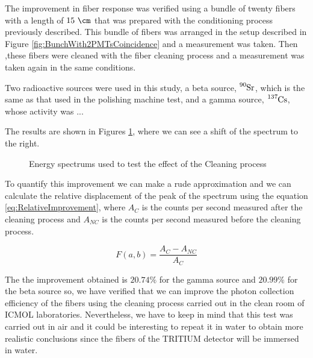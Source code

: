 The improvement in fiber response was verified using a bundle of twenty fibers with a length of $15~\cm$ that was prepared with the conditioning process previously described. This bundle of fibers was arranged in the setup described in Figure \ref{fig:BunchWith2PMTsCoincidence} and a measurement was taken. Then ,these fibers were cleaned with the fiber cleaning process and a measurement was taken again in the same conditions.

Two radioactive sources were used in this study, a beta source, $\ce{^{90}Sr}$, which is the same as that used in the polishing machine test, and a gamma source, $\ce{^{137}Cs}$, whose activity was ...

The results are shown in Figures \ref{fig:ResultsOfCleaningProcess}, where we can see a shift of the spectrum to the right. 

\begin{figure}[htbp]
 \centering
    \newline
 \caption{Energy spectrums used to test the effect of the Cleaning process}
 \label{fig:ResultsOfCleaningProcess}
\end{figure}

To quantify this improvement we can make a rude approximation and we can calculate the relative displacement of the peak of the spectrum using the equation \ref{eq:RelativeImprovement}, where $A_{C}$ is the counts per second measured after the cleaning process and $A_{NC}$ is the counts per second measured before the cleaning process.

\begin{equation}
F(a,b)=\frac{A_{C}-A_{NC}}{A_{C}}
\label{eq:RelativeImprovement}
\end{equation}

The the improvement obtained is $20.74\%$ for the gamma source and $20.99\%$ for the beta source so, we have verified that we can improve the photon collection efficiency of the fibers using the cleaning process carried out in the clean room of ICMOL laboratories. Nevertheless, we have to keep in mind that this test was carried out in air and it could be interesting to repeat it in water to obtain more realistic conclusions since the fibers of the TRITIUM detector will be immersed in water.